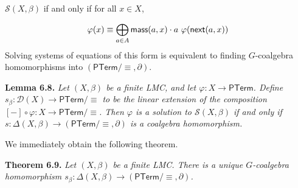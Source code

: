 \hypertarget{html:S6.SSx1.p4.m5}{}\({\mathcal{S}(X,\beta)}\) if and only if for all %
\hypertarget{html:S6.SSx1.p4.m6}{}\({x\in X}\),
\par\medskip
\hypertarget{html:S6.Ex4}{}   %
\hypertarget{html:S6.Ex4.m1}{}\[\varphi(x)\equiv\bigoplus_{a\in A}\mbox{\sf mass}(a,x)\cdot a\leavevmode\nobreak\ \varphi(\mbox{\sf next}(a,x))\]    Solving systems of equations of this form is equivalent to finding %
\hypertarget{html:S6.SSx1.p4.m7}{}\({G}\)-coalgebra homomorphisms into %
\hypertarget{html:S6.SSx1.p4.m8}{}\({(\mathsf{PTerm}/{\equiv},\partial)}\).
\par\medskip
\hypertarget{html:S6.Thmtheorem8}{} \par\noindent\textbf{\textbf{Lemma 6.8}\textbf{.}}\quad  %
\hypertarget{html:S6.Thmtheorem8.p1}{} \emph{Let %
\hypertarget{html:S6.Thmtheorem8.p1.m1}{}\({(X,\beta)}\) be a finite LMC, and let %
\hypertarget{html:S6.Thmtheorem8.p1.m2}{}\({\varphi\colon X\to\mathsf{PTerm}}\). Define %
\hypertarget{html:S6.Thmtheorem8.p1.m3}{}\({s_{\beta}\colon{\mathcal{D}}(X)\to\mathsf{PTerm}/{\equiv}}\) to be the linear extension of the composition %
\hypertarget{html:S6.Thmtheorem8.p1.m4}{}\({[-]\circ\varphi\colon X\to\mathsf{PTerm}/{\equiv}}\). Then %
\hypertarget{html:S6.Thmtheorem8.p1.m5}{}\({\varphi}\) is a solution to %
\hypertarget{html:S6.Thmtheorem8.p1.m6}{}\({\mathcal{S}(X,\beta)}\) if and only if %
\hypertarget{html:S6.Thmtheorem8.p1.m7}{}\({s\colon\Delta(X,\beta)\to(\mathsf{PTerm}/{\equiv},\partial)}\) is a coalgebra homomorphism.}
\par\medskip
\hypertarget{html:S6.SSx1.p5}{} We immediately obtain the following theorem.
\par\medskip
\hypertarget{html:S6.Thmtheorem9}{} \par\noindent\textbf{\textbf{Theorem 6.9}\textbf{.}}\quad  %
\hypertarget{html:S6.Thmtheorem9.p1}{} \emph{Let %
\hypertarget{html:S6.Thmtheorem9.p1.m1}{}\({(X,\beta)}\) be a finite LMC. There is a unique %
\hypertarget{html:S6.Thmtheorem9.p1.m2}{}\({G}\)-coalgebra homomorphism %
\hypertarget{html:S6.Thmtheorem9.p1.m3}{}\({s_{\beta}\colon\Delta(X,\beta)\to(\mathsf{PTerm}/{\equiv},\partial)}\).}
